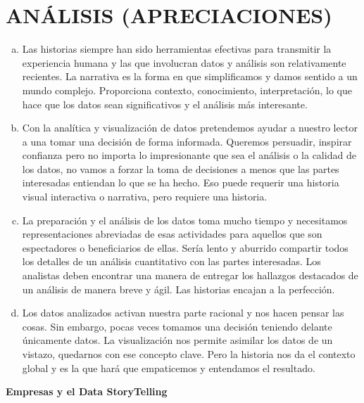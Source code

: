 \documentclass[preprint,12pt]{elsarticle}
\begin{document}
	\section{ANÁLISIS (APRECIACIONES)}
	\begin{enumerate}[a)]
		\item Las historias siempre han sido herramientas efectivas para transmitir la experiencia humana y las que involucran datos y análisis son relativamente recientes. La narrativa es la forma en que simplificamos y damos sentido a un mundo complejo. Proporciona contexto, conocimiento, interpretación, lo que hace que los datos sean significativos y el análisis más interesante.\\
		
		\item Con la analítica y visualización de datos pretendemos ayudar a nuestro lector a una tomar una decisión de forma informada. Queremos persuadir, inspirar confianza pero no importa lo impresionante que sea el análisis o la calidad de los datos, no vamos  a forzar la toma de decisiones a menos que las partes interesadas entiendan lo que se  ha hecho. Eso puede requerir una historia visual interactiva o narrativa, pero requiere una historia.\\
		
		
		\item La preparación y el análisis de los datos toma mucho tiempo y necesitamos representaciones abreviadas de esas actividades para aquellos que son espectadores o beneficiarios de ellas. Sería lento y aburrido compartir todos los detalles de un análisis cuantitativo con las partes interesadas. Los analistas deben encontrar una manera de entregar los hallazgos destacados de un análisis de manera breve y ágil. Las historias encajan a la perfección.\\
		
		\item Los datos analizados activan nuestra parte racional y nos hacen pensar las cosas. Sin embargo, pocas veces tomamos una decisión teniendo delante únicamente datos. La visualización nos permite asimilar los datos de un vistazo, quedarnos con ese concepto clave. Pero la historia nos da el contexto global y es la que hará que empaticemos y entendamos el resultado. 
		
	\end{enumerate}

\textbf{Empresas y el Data StoryTelling}\\
	
\end{document}
